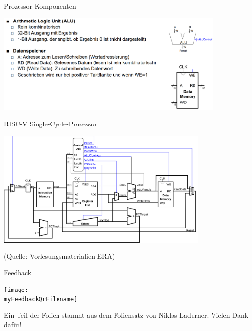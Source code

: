 \documentclass[
  german,            %
  aspectratio=169,    %
]{tumbeamer}
\begin{document}
\begin{frame}[c, fragile]{Prozessor-Komponenten}{}
	\begin{center}
		\includegraphics[width=0.85\textwidth]{w08_prozessorcomponents2.png}
	\end{center}
\end{frame}

\begin{frame}[c]{RISC-V Single-Cycle-Prozessor}{}
	\begin{center}
		\includegraphics[width=0.79\textwidth]{w08_single_cycle.png}
	\end{center}
	\centering
	\tiny (Quelle: Vorlesungsmaterialien ERA)
\end{frame}

\begin{frame}[c]{Feedback}{} 
  \begin{center}
    \texttt{[image: \\myFeedbackQrFilename]}
  \end{center}
  \begin{center}
    \LARGE \href{\myFeedbackLink}{\myFeedbackLink}
  \end{center}
  \vspace{0.5cm}
  \begin{center}
    \small Ein Teil der Folien stammt aus dem Foliensatz von Niklas Ladurner. Vielen Dank dafür!
  \end{center}
\end{frame}
\end{document}
